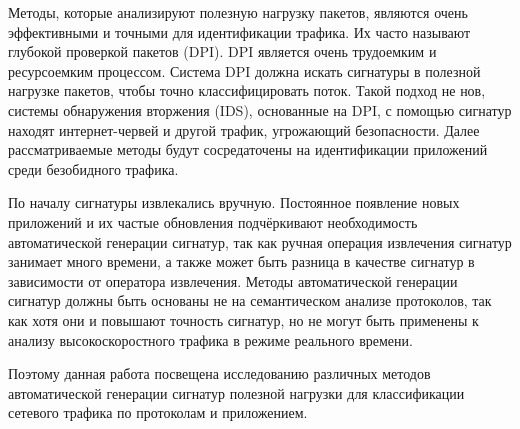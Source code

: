 Методы, которые анализируют полезную нагрузку пакетов, являются очень эффективными и точными для идентификации трафика.
Их часто называют глубокой проверкой пакетов (DPI). DPI является очень трудоемким и ресурсоемким процессом.
Система DPI должна искать сигнатуры в полезной нагрузке пакетов, чтобы точно классифицировать поток. Такой подход не нов, системы обнаружения вторжения (IDS),
основанные на DPI, с помощью сигнатур находят интернет-червей и другой трафик, угрожающий безопасности.
Далее рассматриваемые методы будут сосредаточены на идентификации приложений среди безобидного трафика.

По началу сигнатуры извлекались вручную. Постоянное появление новых приложений и их частые обновления подчёркивают необходимость автоматической генерации сигнатур,
так как ручная операция извлечения сигнатур занимает много времени, а также может быть разница в качестве сигнатур в зависимости от оператора извлечения.
Методы автоматической генерации сигнатур должны быть основаны не на семантическом анализе протоколов, так как хотя они и повышают точность сигнатур,
но не могут быть применены к анализу высокоскоростного трафика в режиме реального времени.

Поэтому данная работа посвещена исследованию различных методов автоматической генерации сигнатур полезной нагрузки для классификации сетевого трафика по протоколам и приложением.

\newpage
